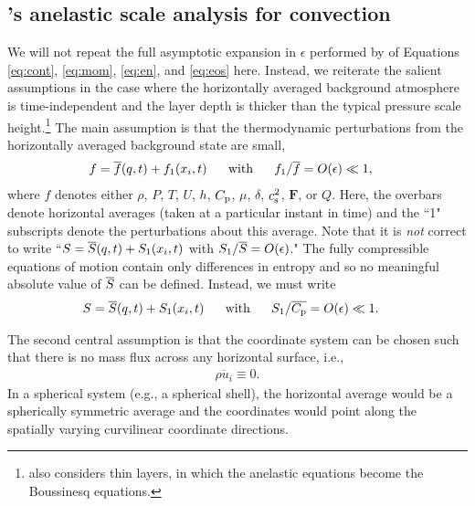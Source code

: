 \documentclass[12pt]{article}
\newcommand{\vecf}{\bm{F}}
\begin{document}
	\subsection{\citet{Gough1969}'s anelastic scale analysis for convection}
	We will not repeat the full asymptotic expansion in $\epsilon$ performed by \citet{Gough1969} of Equations \eqref{eq:cont}, \eqref{eq:mom}, \eqref{eq:en}, and \eqref{eq:eos} here. Instead, we reiterate the salient assumptions in the case where the horizontally averaged background atmosphere is time-independent and the layer depth is thicker than the typical pressure scale height.\footnote{\citet{Gough1969} also considers thin layers, in which the anelastic equations become the Boussinesq equations.} The main assumption is that the thermodynamic perturbations from the horizontally averaged background state are small,
	\begin{align}\label{eq:smallthermalpert}
		f = \overline{f}(q,t) + f_1(x_i,t)\ \ \ \ \  &\text{with}\ \ \ \ \  f_1/\overline{f}=O(\epsilon)\ll 1,
	\end{align} 
	where $f$ denotes either $\rho$, $P$, $T$, $U$, $h$, $C_{\rm{p}}$, $\mu$, $\delta$, $c_{\rm s}^2$, $\vecf$, or $Q$. Here, the overbars denote horizontal averages (taken at a particular instant in time) and the ``1" subscripts denote the perturbations about this average. Note that it is \textit{not} correct to write ``$S=\overline{S}(q,t)+S_1(x_i,t)$ with $S_1/\overline{S}=O(\epsilon)$." The fully compressible equations of motion contain only differences in entropy and so no meaningful absolute value of $\overline{S}$ can be defined. Instead, we must write
	\begin{align}\label{eq:linearent}
	S = \overline{S}(q,t) + S_1(x_i,t) \ \ \ \ \  &\text{with}\ \ \ \ \  S_1/\overline{C_{\rm{p}}}=O(\epsilon)\ll 1.
	\end{align}
	
	The second central assumption is that the coordinate system can be chosen such that there is no mass flux across any horizontal surface, i.e.,
	\begin{align}\label{eq:nomassflux}
		\overline{\rho u_i}\equiv0.
	\end{align}
	In a spherical system (e.g., a spherical shell), the horizontal average would be a spherically symmetric average and the coordinates would point along the spatially varying curvilinear coordinate directions. 
\end{document}
